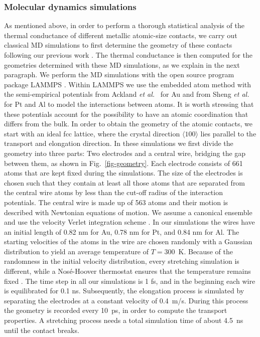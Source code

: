 \documentclass[aps,amsmath,amssymb,twocolumn,showpacs]{revtex4-1}
\begin{document}
\subsubsection{Molecular dynamics simulations}

As mentioned above, in order to perform a thorough statistical analysis of the
thermal conductance of different metallic atomic-size contacts, we carry out
classical MD simulations to first determine the geometry of these contacts
following our previous work \cite{Evangeli2015}. The thermal conductance is
then computed for the geometries determined with these MD simulations, as we
explain in the next paragraph.  We perform the MD simulations with the open
source program package LAMMPS \cite{LAMMPS,Plimpton1995}.  Within LAMMPS we
use the embedded atom method with the semi-empirical potentials from Ackland
\emph{et al.}\ \cite{Ackland1987} for Au and from Sheng \emph{et
  al.}\ \cite{Sheng2011} for Pt and Al to model the interactions between
atoms. It is worth stressing that these potentials account for the possibility
to have an atomic coordination that differs from the bulk. In order to obtain
the geometry of the atomic contacts, we start with an ideal fcc lattice, where
the crystal direction $\langle 100 \rangle$ lies parallel to the transport and
elongation direction. In these simulations we first divide the geometry into
three parts: Two electrodes and a central wire, bridging the gap between them,
as shown in Fig.~\ref{fig-geometry}. Each electrode consists of 661 atoms that
are kept fixed during the simulations. The size of the
  electrodes is chosen such that they contain at least all those atoms that
  are separated from the central wire atoms by less than the cut-off radius of
  the interaction potentials. The central wire is made up of 563 atoms and
their motion is described with Newtonian equations of motion. We assume a
canonical ensemble and use the velocity Verlet integration scheme
\cite{Frenkel2002}.  In our simulations the wires have an initial length of
0.82 nm for Au, 0.78 nm for Pt, and 0.84 nm for Al. The starting velocities of
the atoms in the wire are chosen randomly with a Gaussian distribution to
yield an average temperature of $T = 300$~K. Because of the randomness in the
initial velocity distribution, every stretching simulation is different, while
a Nos\'e-Hoover thermostat ensures that the temperature remains fixed
\cite{Frenkel2002}. The time step in all our simulations is 1
  fs, and in the beginning each wire is equilibrated for 0.1 ns.
Subsequently, the elongation process is simulated by separating the electrodes
at a constant velocity of 0.4~m/s. During this process the geometry is
recorded every 10~ps, in order to compute the transport properties. A
stretching process needs a total simulation time of about 4.5~ns until the
contact breaks.
\end{document}
